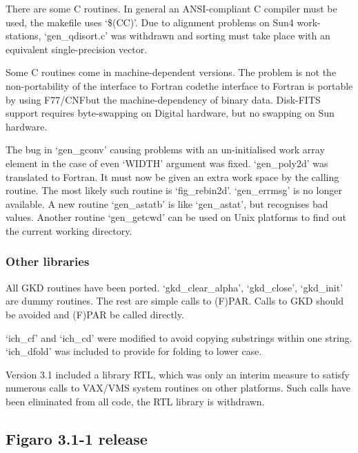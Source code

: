    There are some C routines. In general an ANSI-compliant C compiler
   must be used, the makefile uses `\$(CC)'. Due to alignment problems
   on Sun4 work-stations, `gen\_qdisort.c' was withdrawn and sorting must
   take place with an equivalent single-precision vector.

   Some C routines come in machine-dependent versions.  The problem
   is not the non-portability of the interface to Fortran
   code\latorhtm{---}{-}the
   interface to Fortran is portable by using F77/CNF\latorhtm{---}{-}but the
   machine-dependency of binary data.  Disk-FITS support requires
   byte-swapping on Digital hardware, but no swapping on Sun hardware.

   The bug in `gen\_gconv' causing problems with an un-initialised work
   array element in the case of even `WIDTH' argument was fixed.
   `gen\_poly2d' was translated to Fortran.  It must now be given an
   extra work space by the calling routine.  The most likely such
   routine is `fig\_rebin2d'.  `gen\_errmsg' is no longer available. A new
   routine `gen\_astatb' is like `gen\_astat', but recognises bad values.
   Another routine `gen\_getcwd' can be used on Unix platforms to find
   out the current working directory.


\subsubsection{\label{changessub10}Other libraries}

   All GKD routines have been ported. `gkd\_clear\_alpha', `gkd\_close',
   `gkd\_init' are dummy routines. The rest are simple calls to (F)PAR.
   Calls to GKD should be avoided and (F)PAR be called directly.


   `ich\_cf' and `ich\_cd' were modified to avoid copying substrings
   within one string. `ich\_dfold' was included to provide for folding to
   lower case.


   Version 3.1 included a library RTL, which was only an interim measure
   to satisfy numerous calls to VAX/VMS system routines on other
   platforms.  Such calls have been eliminated from all code, the RTL
   library is withdrawn.


\subsection{\label{news311}Figaro 3.1-1 release}

